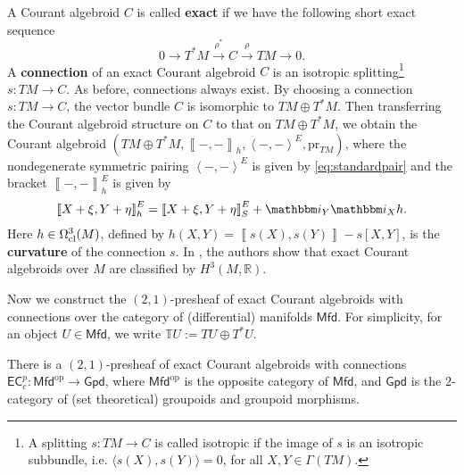 \documentclass[letterpaper,10pt, oneside]{article} %
\newtheorem{pro}[thm]{Proposition}
\newcommand{\Mfd}{\mathsf{Mfd}}%
\newcommand{\Gpd}{\mathsf{Gpd}}%
\newcommand{\ecalgdp}{\mathsf{EC}^{p}_{c}} %
\newcommand{\tangu}{{\mathbb{T} U}}
\newcommand{\op}{\mathrm{op}}%
\newcommand{\ii}{\mathbbm i}
\newcommand{\R}{\mathbb R}\newcommand{\Z}{\mathbb Z}
\newcommand{\pair}[1]{\left\langle #1\right\rangle}
\newcommand{\Courant}[1]{\left\llbracket  #1\right\rrbracket }
\newcommand{\pr}{\mathrm{pr}}
\begin{document}
A Courant algebroid $C$ is called {\bf exact} if we have the following short exact sequence
$$
0\longrightarrow T^*M\stackrel{\rho^*}{\longrightarrow} C\stackrel{\rho}{\longrightarrow}TM\longrightarrow 0.
$$
A {\bf connection} of an exact Courant algebroid $C$ is an isotropic splitting\footnote{A splitting $s:TM\longrightarrow C$ is called isotropic if the image of $s$ is an isotropic subbundle, i.e. $\langle s(X),s(Y)\rangle=0$, for all $X,Y\in \Gamma(TM)$.} $s:TM\longrightarrow C$. As before, connections always exist. By choosing a connection $s:TM\longrightarrow C$, the vector bundle $C$ is isomorphic to $TM\oplus T^*M$. Then transferring the Courant algebroid structure on $C$ to that on $TM\oplus T^*M$, we obtain the Courant algebroid $(TM\oplus T^*M, \Courant{-,-}_h,\pair{-,-}^E, \pr_{TM})$, where the nondegenerate symmetric pairing  $\pair{-,-}^E$ is given by \eqref{eq:standardpair} and the bracket $\Courant{-,-}^E_h$ is given by
\begin{equation}\label{eq:hbracket}
  \Courant{X+\xi,Y+\eta}^E_h= \Courant{X+\xi,Y+\eta}^E_S+\ii_Y\ii_Xh.
  \end{equation}
Here  $h\in\Omega^3_{\rm cl}(M)$, defined by $h(X,Y)=\Courant{s(X),s(Y)}-s[X,Y]$,  is the {\bf curvature} of the connection $s$. In \cite{Severa:3-form}, the authors show that exact Courant algebroids over $M$ are classified by $H^3(M, \R)$.






Now we construct the $(2,1)$-presheaf of exact Courant algebroids with
connections over
the category of (differential) manifolds $\Mfd$. For simplicity, for an object $U\in \Mfd$, we write $\tangu:=TU\oplus T^*U.$

There is a $(2,1)$-presheaf of exact Courant algebroids with
connections $\ecalgdp: \Mfd^{\op} \to \Gpd$, where $\Mfd^{\op}$ is the
opposite  category of $\Mfd$, and $\Gpd$ is the
$2$-category of (set theoretical) groupoids and groupoid morphisms.
\end{document}
